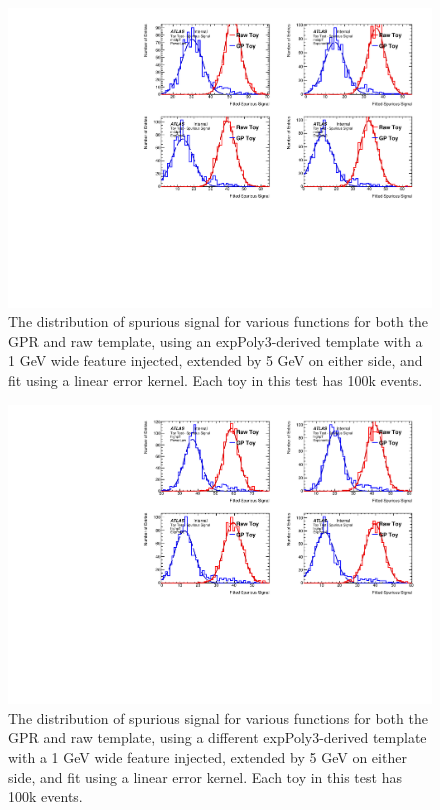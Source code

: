 \begin{figure} 
\begin{center}
  \includegraphics[width=\textwidth]{figures/background/gpr/validation/linear/ToyTest_FitSigVals_medpT_100k_Sig_1s}   
\caption{The distribution of spurious signal for various functions for both the GPR and raw template, using an expPoly3-derived template with a 1 GeV wide feature injected, extended by 5 GeV on either side, and fit using a linear error kernel. Each toy in this test has 100k events.}
\label{fig:linearkernel_medpt_100k_Sig_1s}
\end{center}
\end{figure}

\begin{figure} 
\begin{center}
  \includegraphics[width=\textwidth]{figures/background/gpr/validation/linear/ToyTest_FitSigVals_highpT_100k_Sig_1s}   
\caption{The distribution of spurious signal for various functions for both the GPR and raw template, using a different expPoly3-derived template with a 1 GeV wide feature injected, extended by 5 GeV on either side, and fit using a linear error kernel. Each toy in this test has 100k events.}
\label{fig:linearkernel_highpt_100k_Sig_1s}
\end{center}
\end{figure}


